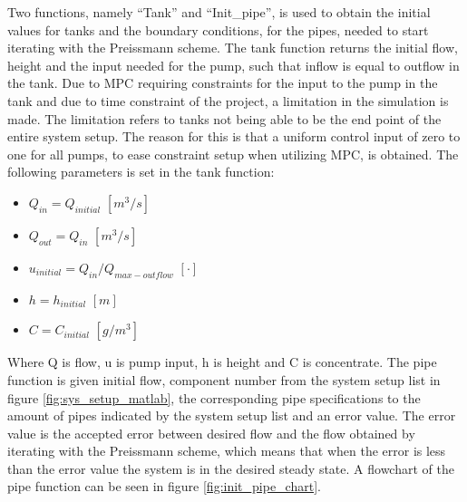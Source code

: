 {Two functions, namely ``Tank'' and ``Init\_pipe'', is used to obtain the initial values for tanks and the boundary conditions, for the pipes, needed to start iterating with the Preissmann scheme. The tank function returns the initial flow, height and the input needed for the pump, such that inflow is equal to outflow in the tank. Due to MPC requiring constraints for the input to the pump in the tank and due to time constraint of the project, a limitation in the simulation is made. The limitation refers to tanks not being able to be the end point of the entire system setup. The reason for this is that a uniform control input of zero to one for all pumps, to ease constraint setup when utilizing MPC, is obtained. The following parameters is set in the tank function:
\begin{itemize}
	\item $Q_{in} = Q_{initial}$ $[m^3/s]$
	\item $Q_{out} = Q_{in}$ $[m^3/s]$
	\item $u_{initial} = Q_{in}/Q_{max-outflow}$ $[\cdot]$
	\item $h = h_{initial}$ $[m]$
	\item $C = C_{initial}$ $[g/m^3]$
\end{itemize}

Where Q is flow, u is pump input, h is height and C is concentrate.
The pipe function is given initial flow, component number from the system setup list in figure \ref{fig:sys_setup_matlab}, the corresponding pipe specifications to the amount of pipes indicated by the system setup list and an error value. The error value is the accepted error between desired flow and the flow obtained by iterating with the Preissmann scheme, which means that when the error is less than the error value the system is in the desired steady state. A flowchart of the pipe function can be seen in figure \ref{fig:init_pipe_chart}. 

}
